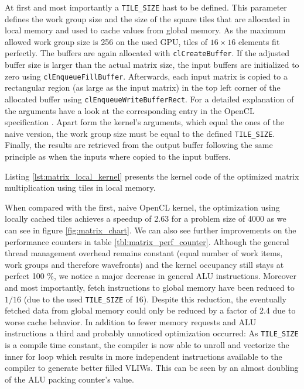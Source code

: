 At first and most importantly a \lstinline!TILE_SIZE! hast to be defined. This parameter defines the work group size and the size of the square tiles that are allocated in local memory and used to cache values from global memory. As the maximum allowed work group size is 256 on the used GPU, tiles of $16 \times 16$ elements fit perfectly.
The buffers are again allocated with \lstinline!clCreateBuffer!. If the adjusted buffer size is larger than the actual matrix size, the input buffers are initialized to zero using \lstinline!clEnqueueFillBuffer!. Afterwards, each input matrix is copied to a rectangular region (as large as the input matrix) in the top left corner of the allocated buffer using \lstinline!clEnqueueWriteBufferRect!. For a detailed explanation of the arguments have a look at the corresponding entry in the OpenCL specification \cite[p.76]{opencl_spec}. Apart form the kernel's arguments, which equal the ones of the naive version, the work group size must be equal to the defined \lstinline!TILE_SIZE!. Finally, the results are retrieved from the output buffer following the same principle as when the inputs where copied to the input buffers.

Listing \ref{lst:matrix_local_kernel} presents the kernel code of the optimized matrix multiplication using tiles in local memory.



When compared with the first, naive OpenCL kernel, the optimization using locally cached tiles achieves a speedup of 2.63 for a problem size of 4000 as we can see in figure \ref{fig:matrix_chart}.
We can also see further improvements on the performance counters in table \ref{tbl:matrix_perf_counter}. Although the general thread management overhead remains constant (equal number of work items, work groups and therefore wavefronts) and the kernel occupancy still stays at perfect 100 \%, we notice a major decrease in general ALU instructions. Moreover and most importantly, fetch instructions to global memory have been reduced to $1 / 16$ (due to the used \lstinline!TILE_SIZE! of 16). Despite this reduction, the eventually fetched data from global memory could only be reduced by a factor of 2.4 due to worse cache behavior.
In addition to fewer memory requests and ALU instructions a third and probably unnoticed optimization occurred: As \lstinline!TILE_SIZE! is a compile time constant, the compiler is now able to unroll and vectorize the inner for loop which results in more independent instructions available to the compiler to generate better filled VLIWs. This can be seen by an almost doubling of the ALU packing counter's value.


